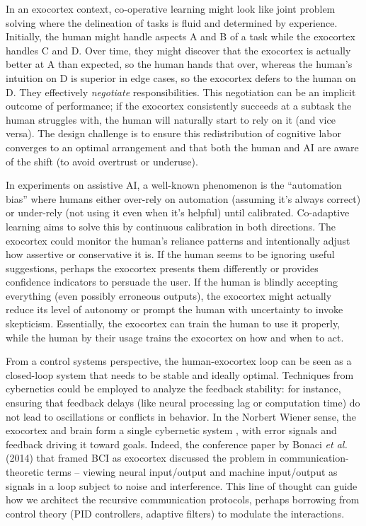 \documentclass[11pt]{article}
\newcommand{\quotes}[1]{``#1''}
\begin{document}
In an exocortex context, co-operative learning might look like joint problem solving where the delineation of tasks is fluid and determined by experience. Initially, the human might handle aspects A and B of a task while the exocortex handles C and D. Over time, they might discover that the exocortex is actually better at A than expected, so the human hands that over, whereas the human's intuition on D is superior in edge cases, so the exocortex defers to the human on D. They effectively \textit{negotiate} responsibilities. This negotiation can be an implicit outcome of performance; if the exocortex consistently succeeds at a subtask the human struggles with, the human will naturally start to rely on it (and vice versa). The design challenge is to ensure this redistribution of cognitive labor converges to an optimal arrangement and that both the human and AI are aware of the shift (to avoid overtrust or underuse).

In experiments on assistive AI, a well-known phenomenon is the \quotes{automation bias} where humans either over-rely on automation (assuming it's always correct) or under-rely (not using it even when it's helpful) until calibrated. Co-adaptive learning aims to solve this by continuous calibration in both directions. The exocortex could monitor the human's reliance patterns and intentionally adjust how assertive or conservative it is. If the human seems to be ignoring useful suggestions, perhaps the exocortex presents them differently or provides confidence indicators to persuade the user. If the human is blindly accepting everything (even possibly erroneous outputs), the exocortex might actually reduce its level of autonomy or prompt the human with uncertainty to invoke skepticism. Essentially, the exocortex can train the human to use it properly, while the human by their usage trains the exocortex on how and when to act.

From a control systems perspective, the human-exocortex loop can be seen as a closed-loop system that needs to be stable and ideally optimal. Techniques from cybernetics could be employed to analyze the feedback stability: for instance, ensuring that feedback delays (like neural processing lag or computation time) do not lead to oscillations or conflicts in behavior. In the Norbert Wiener sense, the exocortex and brain form a single cybernetic system \cite{Wiener1948}, with error signals and feedback driving it toward goals. Indeed, the conference paper by Bonaci \textit{et al.} (2014) that framed BCI as exocortex discussed the problem in communication-theoretic terms -- viewing neural input/output and machine input/output as signals in a loop subject to noise and interference. This line of thought can guide how we architect the recursive communication protocols, perhaps borrowing from control theory (PID controllers, adaptive filters) to modulate the interactions.
\end{document}

